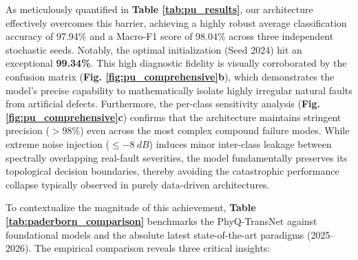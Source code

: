 \documentclass[5p,times,twocolumn]{elsarticle}
\begin{document}
As meticulously quantified in \textbf{Table \ref{tab:pu_results}}, our architecture effectively overcomes this barrier, achieving a highly robust average classification accuracy of 97.94\% and a Macro-F1 score of 98.04\% across three independent stochastic seeds. Notably, the optimal initialization (Seed 2024) hit an exceptional \textbf{99.34\%}. This high diagnostic fidelity is visually corroborated by the confusion matrix (\textbf{Fig. \ref{fig:pu_comprehensive}b}), which demonstrates the model's precise capability to mathematically isolate highly irregular natural faults from artificial defects. Furthermore, the per-class sensitivity analysis (\textbf{Fig. \ref{fig:pu_comprehensive}c}) confirms that the architecture maintains stringent precision ($>98\%$) even across the most complex compound failure modes. While extreme noise injection ($\leq \SI{-8}{dB}$) induces minor inter-class leakage between spectrally overlapping real-fault severities, the model fundamentally preserves its topological decision boundaries, thereby avoiding the catastrophic performance collapse typically observed in purely data-driven architectures.

To contextualize the magnitude of this achievement, \textbf{Table \ref{tab:paderborn_comparison}} benchmarks the PhyQ-TransNet against foundational models and the absolute latest state-of-the-art paradigms (2025--2026). The empirical comparison reveals three critical insights:
\end{document}
